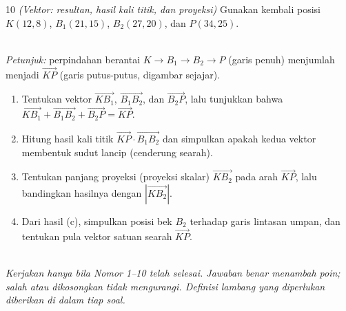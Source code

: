 \documentclass[11pt]{article}
\newenvironment{subsoal}{%
  \begin{enumerate}[label=\textbf{(\alph*)},leftmargin=1.8em,itemsep=5pt,topsep=3pt]}%
  {\end{enumerate}}
\begin{document}
\begin{soal}{10 \normalfont\itshape(Vektor: resultan, hasil kali titik, dan proyeksi)}
Gunakan kembali posisi $K(12,8)$, $B_1(21,15)$, $B_2(27,20)$, dan $P(34,25)$.

\begin{center}
\\[2pt]
{\small\textit{Petunjuk:} perpindahan berantai $K\to B_1\to B_2\to P$ (garis penuh) menjumlah menjadi $\vec{KP}$ (garis putus-putus, digambar sejajar).}
\end{center}

\begin{subsoal}
  \item Tentukan vektor $\vec{KB_1}$, $\vec{B_1B_2}$, dan $\vec{B_2P}$, lalu
        tunjukkan bahwa $\vec{KB_1}+\vec{B_1B_2}+\vec{B_2P}=\vec{KP}$.
  \item Hitung hasil kali titik $\vec{KP}\cdot\vec{B_1B_2}$ dan simpulkan apakah
        kedua vektor membentuk sudut lancip (cenderung searah).
  \item Tentukan panjang proyeksi (proyeksi skalar) $\vec{KB_2}$ pada arah
        $\vec{KP}$, lalu bandingkan hasilnya dengan $|\vec{KB_2}|$.
  \item Dari hasil (c), simpulkan posisi bek $B_2$ terhadap garis lintasan umpan,
        dan tentukan pula vektor satuan searah $\vec{KP}$.
\end{subsoal}
\end{soal}

\clearpage
{}\\[0.2em]
\small\emph{Kerjakan hanya bila Nomor 1--10 telah selesai. Jawaban benar menambah
poin; salah atau dikosongkan tidak mengurangi. Definisi lambang yang diperlukan
diberikan di dalam tiap soal.}\normalsize
\end{document}
